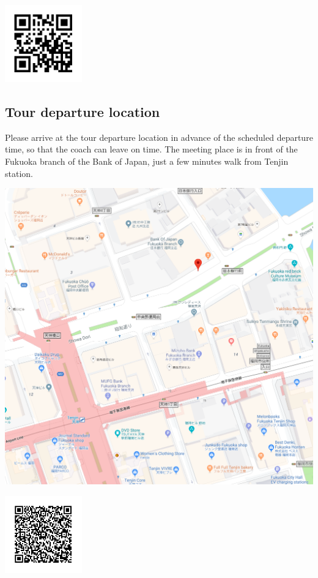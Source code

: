 \includegraphics[width=0.25\textwidth]{uminomichi_qr.png}

\newpage
\subsection*{Tour departure location}

Please arrive at the tour departure location in advance of the scheduled departure time, so that the
coach can leave on time.   
The meeting place is in front of the Fukuoka branch of the Bank of Japan, just a few minutes walk from Tenjin station.

\noindent\includegraphics[width=\textwidth]{tour_meeting_place.png}

\includegraphics[width=0.25\textwidth]{tour_meeting_place_qrcode.png}


